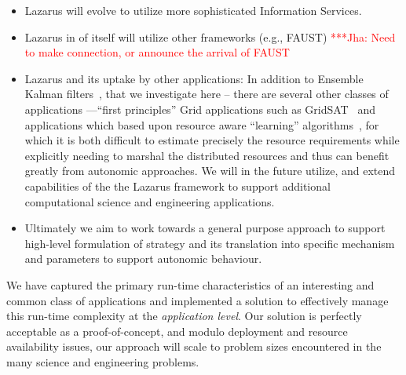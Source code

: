 \documentclass[conference,final]{IEEEtran}
\newcommand{\jhanote}[1]{ {\textcolor{red} { ***Jha: #1 }}}
\newcommand{\jhanote}[1]{}
\begin{document}
\begin{itemize}
\item Lazarus will evolve to utilize more sophisticated Information Services.
\item Lazarus in of itself will utilize other frameworks (e.g., FAUST)
\jhanote{Need to make connection, or announce the arrival of FAUST}

\item Lazarus and its uptake by other applications: In addition to
  Ensemble Kalman filters~\cite{DataAssim, KalmanPaper}, that we
  investigate here -- there are several other classes of applications
  ---``first principles'' Grid applications such as
  GridSAT~\cite{gridsat03} and applications which based upon resource
  aware ``learning'' algorithms~\cite{ majority_voting}, for which it
  is both difficult to estimate precisely the resource requirements
  while explicitly needing to marshal the distributed resources and
  thus can benefit greatly from autonomic approaches. We will in the
  future utilize, and extend capabilities of the the Lazarus framework
  to support additional computational science and engineering
  applications.

\item Ultimately we aim to work towards a general purpose approach to
  support high-level formulation of strategy and its translation into
  specific mechanism and parameters to support autonomic behaviour.
\end{itemize}

We have captured the primary run-time characteristics of an
interesting and common class of applications and implemented a
solution to effectively manage this run-time complexity at the {\it
  application level}.  Our solution is perfectly acceptable as a
proof-of-concept, and modulo deployment and resource availability
issues, our approach will scale to problem sizes encountered in the
many science and engineering problems.




\end{document}
